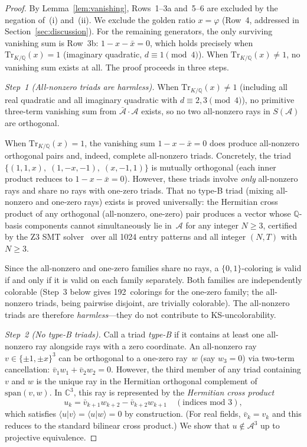 \documentclass[12pt,a4paper]{article}
\newcommand{\C}{\mathbb{C}}
\newcommand{\Q}{\mathbb{Q}}
\newcommand{\Tr}[1]{\mathrm{Tr}_{K/\Q}\!\left(#1\right)}
\newcommand{\braket}[2]{\langle #1 | #2 \rangle}
\begin{document}
\begin{proof}
By Lemma~\ref{lem:vanishing}, Rows~1--3a and~5--6 are excluded by the
negation of~(i) and~(ii).  We exclude the golden ratio
$x = \varphi$ (Row~4, addressed in Section~\ref{sec:discussion}).
For the remaining generators, the only surviving vanishing sum is
Row~3b: $1 - x - \bar{x} = 0$, which holds precisely when $\Tr{x} = 1$
(imaginary quadratic, $d \equiv 1 \pmod{4}$).  When $\Tr{x} \neq 1$,
no vanishing sum exists at all.  The proof proceeds in three steps.

\medskip
\noindent\textit{Step~1 (All-nonzero triads are harmless).}
When $\Tr{x} \neq 1$ (including all real quadratic and all imaginary
quadratic with $d \equiv 2, 3 \pmod{4}$), no primitive three-term
vanishing sum from $\bar{\mathcal{A}} \cdot \mathcal{A}$ exists,
so no two all-nonzero rays in $S(\mathcal{A})$ are orthogonal.

When $\Tr{x} = 1$, the vanishing sum $1 - x - \bar{x} = 0$ does
produce all-nonzero orthogonal pairs and, indeed, complete
all-nonzero triads.  Concretely, the triad
$\{(1, 1, x),\; (1, -x, -1),\; (x, -1, 1)\}$ is mutually orthogonal
(each inner product reduces to $1 - x - \bar{x} = 0$).
However, these triads involve \emph{only} all-nonzero rays and share
no rays with one-zero triads.  That no type-B triad (mixing
all-nonzero and one-zero rays) exists is proved universally: the
Hermitian cross product of any orthogonal (all-nonzero, one-zero) pair
produces a vector whose $\Q$-basis components cannot simultaneously
lie in~$\mathcal{A}$ for any integer $N \geq 3$, certified by the Z3
SMT solver~\cite{deMouraBjorner2008} over all 1024 entry patterns and
all integer $(N, T)$ with $N \geq 3$.

Since the all-nonzero and one-zero families share no rays,
a $\{0,1\}$-coloring is valid if and only if it is valid on each
family separately.  Both families are independently colorable
(Step~3 below gives 192~colorings for the one-zero family; the
all-nonzero triads, being pairwise disjoint, are trivially colorable).
The all-nonzero triads are therefore \emph{harmless}---they do not
contribute to KS-uncolorability.

\medskip
\noindent\textit{Step~2 (No type-B triads).}
Call a triad \emph{type-B} if it contains at least one all-nonzero ray
alongside rays with a zero coordinate.  An all-nonzero ray
$v \in \{\pm 1, \pm x\}^3$ can be orthogonal to a one-zero ray~$w$
(say $w_3 = 0$) via two-term cancellation:
$\bar{v}_1 w_1 + \bar{v}_2 w_2 = 0$.  However, the third member of
any triad containing $v$ and $w$ is the unique ray in the Hermitian
orthogonal complement of $\mathrm{span}(v, w)$.  In $\C^3$, this ray
is represented by the \emph{Hermitian cross product}
\[
  u_k = \bar{v}_{k+1} w_{k+2} - \bar{v}_{k+2} w_{k+1}
  \quad (\text{indices mod } 3),
\]
which satisfies $\braket{u}{v} = \braket{u}{w} = 0$ by construction.
(For real fields, $\bar{v}_k = v_k$ and this reduces to the standard
bilinear cross product.)  We show that $u \notin \mathcal{A}^3$ up to
projective equivalence.


\end{proof}
\end{document}
